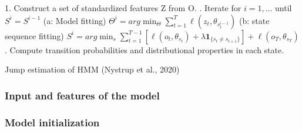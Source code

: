 \begin{algorithm}[H]
\SetAlgoLined
{}

    1. Construct a set of standardized features Z from O. . Iterate for $i=1,\ldots$ until $S^i=S^{i-1}$ \newline
    (a: Model fitting) $\Theta^i = arg\min_{\Theta} \sum_{t=1}^T \ell(z_t, \theta_{s_t^{i-1}})$ \newline
    (b: state sequence fitting) $S^i = arg\min_s \sum_{t=1}^{T-1} [\ell(o_t, \theta_{s_t}) + \lambda\mathbf{1}_{\{ s_t\ne s_{t+1} \}}]
        + \ell(o_T, \theta_{s_T})$
    . Compute transition probabilities and distributional properties in each state. \newline
    



\caption{Jump estimation of HMM (Nystrup et al., 2020)}
\label{algo:jump_fit}
\end{algorithm}

\subsubsection{Input and features of the model}

\subsubsection{Model initialization}
